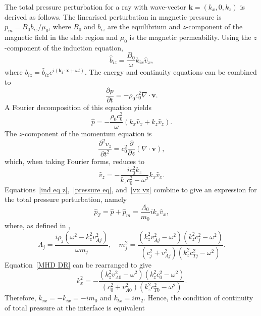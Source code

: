 \documentclass[12pt]{../style-files/ociamthesis}
\begin{document}
	The total pressure perturbation for a ray with wave-vector $\mathbf{k} = (k_x, 0, k_z)$ is derived as follows. The linearised perturbation in magnetic pressure is $p_m = B_0b_{iz}/\mu_0$, where $B_0$ and $b_{iz}$ are the equilibrium and $z$-component of the magnetic field in the slab region and $\mu_0$ is the magnetic permeability. Using the $z$-component of the induction equation,
	\begin{equation}
	\hat{b}_{iz} = \frac{B_0}{\omega}k_{ix}\hat{v}_x, \label{ind eq z}
	\end{equation}
	where $b_{iz} = \hat{b}_{iz} e^{i(\mathbf{k_i}\cdot \mathbf{x} + \omega t)}$. The energy and continuity equations can be combined to
	\begin{equation}
	\frac{\partial p}{\partial t} = - \rho_0 c_0^2 \nabla \cdot \mathbf{v}.
	\end{equation}
	A Fourier decomposition of this equation yields
	\begin{equation}
	\hat{p} = -\frac{\rho_0c_0^2}{\omega} (k_x\hat{v}_x + k_z\hat{v}_z). \label{pressure eq}
	\end{equation}
	The $z$-component of the momentum equation is
	\begin{equation}
	\frac{\partial^2 v_z}{\partial t^2} = c_0^2 \frac{\partial}{\partial z}(\nabla \cdot \mathbf{v}),
	\end{equation}
	which, when taking Fourier forms, reduces to
	\begin{equation}
	\hat{v}_z = - \frac{ic_0^2k_z}{k_zc_0^2 - \omega^2}k_x\hat{v}_x. \label{vx vz}
	\end{equation}
	Equations~\eqref{ind eq z},~\eqref{pressure eq}, and~\eqref{vx vz} combine to give an expression for the total pressure perturbation, namely
	\begin{equation}
	\hat{p}_T = \hat{p} + \hat{p}_m = \frac{\Lambda_0}{m_0}ik_x\hat{v}_x,
	\end{equation}
	where, as defined in \cite{all_etal17},
	\begin{equation}
	\Lambda_j = \frac{i\rho_j(\omega^2 - k_z^2v_{Aj}^2)}{\omega m_j}, \quad m_j^2 = \frac{(k_z^2 v_{Aj}^2 - \omega^2)(k_z^2 c_{j}^2 - \omega^2)}{(c_j^2 + v_{Aj}^2)(k_z^2 c_{Tj}^2 - \omega^2)}.
	\end{equation}
	Equation~\eqref{MHD DR} can be rearranged to give
	\begin{equation}
	k_x^2 = -\frac{(k_z^2 v_{A0}^2 - \omega^2)(k_z^2 c_{0}^2 - \omega^2)}{(c_0^2 + v_{A0}^2)(k_z^2 c_{T0}^2 - \omega^2)}.
	\end{equation}
	Therefore, $k_{rx} = -k_{ix} = -im_0$ and $k_{tx} = im_2$. Hence, the condition of continuity of total pressure at the interface is equivalent
\end{document}
